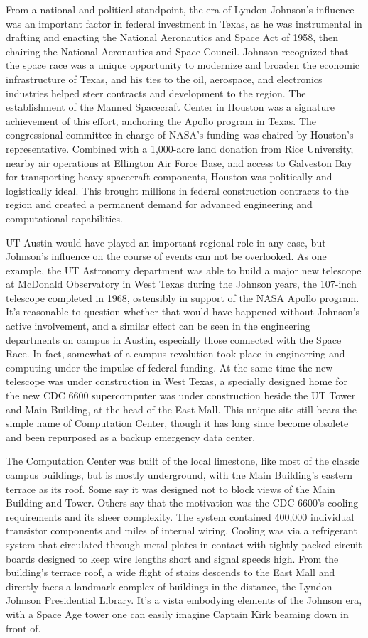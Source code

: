 From a national and political standpoint, the era of Lyndon Johnson’s influence was an important factor in federal investment in Texas, as he was instrumental in drafting and enacting the National Aeronautics and Space Act of 1958, then chairing the National Aeronautics and Space Council. Johnson recognized that the space race was a unique opportunity to modernize and broaden the economic infrastructure of Texas, and his ties to the oil, aerospace, and electronics industries helped steer contracts and development to the region. The establishment of the Manned Spacecraft Center in Houston was a signature achievement of this effort, anchoring the Apollo program in Texas. The congressional committee in charge of NASA’s funding was chaired by Houston’s representative. Combined with a 1,000-acre land donation from Rice University, nearby air operations at Ellington Air Force Base, and access to Galveston Bay for transporting heavy spacecraft components, Houston was politically and logistically ideal. This brought millions in federal construction contracts to the region and created a permanent demand for advanced engineering and computational capabilities. 

UT Austin would have played an important regional role in any case, but Johnson’s influence on the course of events can not be overlooked. As one example, the UT Astronomy department was able to build a major new telescope at McDonald Observatory in West Texas during the Johnson years, the 107-inch telescope completed in 1968, ostensibly in support of the NASA Apollo program. It’s reasonable to question whether that would have happened without Johnson's active involvement, and a similar effect can be seen in the engineering departments on campus in Austin, especially those connected with the Space Race. In fact, somewhat of a campus revolution took place in engineering and computing under the impulse of federal funding. At the same time the new telescope was under construction in West Texas, a specially designed home for the new CDC 6600 supercomputer was under construction beside the UT Tower and Main Building, at the head of the East Mall. This unique site still bears the simple name of Computation Center, though it has long since become obsolete and been repurposed as a backup emergency data center. 

The Computation Center was built of the local limestone, like most of the classic campus buildings, but is mostly underground, with the Main Building’s eastern terrace as its roof. Some say it was designed not to block views of the Main Building and Tower. Others say that the motivation was the CDC 6600’s cooling requirements and its sheer complexity. The system contained 400,000 individual transistor components and miles of internal wiring. Cooling was via a refrigerant system that circulated through metal plates in contact with tightly packed circuit boards designed to keep wire lengths short and signal speeds high. From the building’s terrace roof, a wide flight of stairs descends to the East Mall and directly faces a landmark complex of buildings in the distance, the Lyndon Johnson Presidential Library. It’s a vista embodying elements of the Johnson era, with a Space Age tower one can easily imagine Captain Kirk beaming down in front of. 

